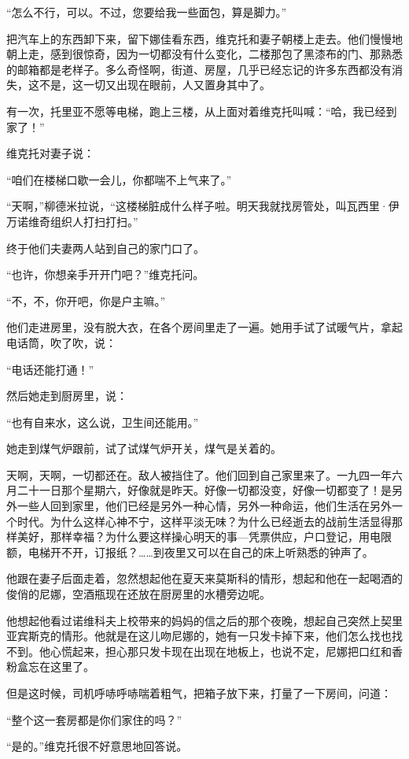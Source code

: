 “怎么不行，可以。不过，您要给我一些面包，算是脚力。”

把汽车上的东西卸下来，留下娜佳看东西，维克托和妻子朝楼上走去。他们慢慢地朝上走，感到很惊奇，因为一切都没有什么变化，二楼那包了黑漆布的门、那熟悉的邮箱都是老样子。多么奇怪啊，街道、房屋，几乎已经忘记的许多东西都没有消失，这不是，这一切又出现在眼前，人又置身其中了。

有一次，托里亚不愿等电梯，跑上三楼，从上面对着维克托叫喊：“哈，我已经到家了！”

维克托对妻子说：

“咱们在楼梯口歇一会儿，你都喘不上气来了。”

“天啊，”柳德米拉说，“这楼梯脏成什么样子啦。明天我就找房管处，叫瓦西里·伊万诺维奇组织人打扫打扫。”

终于他们夫妻两人站到自己的家门口了。

“也许，你想亲手开开门吧？”维克托问。

“不，不，你开吧，你是户主嘛。”

他们走进房里，没有脱大衣，在各个房间里走了一遍。她用手试了试暖气片，拿起电话筒，吹了吹，说：

“电话还能打通！”

然后她走到厨房里，说：

“也有自来水，这么说，卫生间还能用。”

她走到煤气炉跟前，试了试煤气炉开关，煤气是关着的。

天啊，天啊，一切都还在。敌人被挡住了。他们回到自己家里来了。一九四一年六月二十一日那个星期六，好像就是昨天。好像一切都没变，好像一切都变了！是另外一些人回到家里，他们已经是另外一种心情，另外一种命运，他们生活在另外一个时代。为什么这样心神不宁，这样平淡无味？为什么已经逝去的战前生活显得那样美好，那样幸福？为什么要这样操心明天的事—凭票供应，户口登记，用电限额，电梯开不开，订报纸？……到夜里又可以在自己的床上听熟悉的钟声了。

他跟在妻子后面走着，忽然想起他在夏天来莫斯科的情形，想起和他在一起喝酒的俊俏的尼娜，空酒瓶现在还放在厨房里的水槽旁边呢。

他想起他看过诺维科夫上校带来的妈妈的信之后的那个夜晚，想起自己突然上契里亚宾斯克的情形。他就是在这儿吻尼娜的，她有一只发卡掉下来，他们怎么找也找不到。他心慌起来，担心那只发卡现在出现在地板上，也说不定，尼娜把口红和香粉盒忘在这里了。

但是这时候，司机呼哧呼哧喘着粗气，把箱子放下来，打量了一下房间，问道：

“整个这一套房都是你们家住的吗？”

“是的。”维克托很不好意思地回答说。

